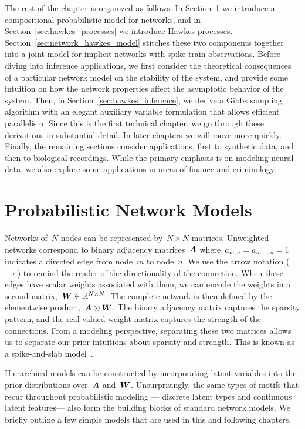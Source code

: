 The rest of the chapter is organized as follows. In
Section~\ref{sec:graph_models} we introduce a compositional
probabilistic model for networks, and in
Section~\ref{sec:hawkes_processes} we introduce Hawkes processes.
Section~\ref{sec:network_hawkes_model} stitches these two components
together into a joint model for implicit networks with spike train
observations.  Before diving into inference applications, we first
consider the theoretical consequences of a particular network model on
the stability of the system, and provide some intuition on how the
network properties affect the asymptotic behavior of the system.
Then, in Section~\ref{sec:hawkes_inference}, we derive a Gibbs
sampling algorithm with an elegant auxiliary variable formulation that
allows efficient parallelism. Since this is the first technical
chapter, we go through these derivations in substantial detail. In
later chapters we will move more quickly.  Finally, the remaining
sections consider applications, first to synthetic data, and then to
biological recordings.  While the primary emphasis is on modeling
neural data, we also explore some applications in areas of finance and
criminology.

\section{Probabilistic Network Models}
\label{sec:graph_models}
Networks of~$N$ nodes can be represented by~${N\times N}$
matrices. Unweighted networks correspond to binary adjacency
matrices~$\boldsymbol{A}$ where~${a_{m,n}=a_{m \to n}=1}$ indicates a directed
edge from node~$m$ to node~$n$. We use the arrow notation ($\to$) to
remind the reader of the directionality of the connection. When these
edges have scalar weights associated with them, we can encode the
weights in a second matrix,~${\boldsymbol{W} \in \mathbb{R}^{N \times N}}$.  The
complete network is then defined by the elementwise product,~${\boldsymbol{A}
  \odot \boldsymbol{W}}$. The binary adjacency matrix captures the sparsity
pattern, and the real-valued weight matrix captures the strength of
the connections. From a modeling perspective, separating these two
matrices allows us to separate our prior intuitions about sparsity and
strength. This is known as a spike-and-slab model~\citep{Mitchell1988}.


Hierarchical models can be constructed by incorporating latent
variables into the prior distributions over~$\boldsymbol{A}$ and~$\boldsymbol{W}$.
Unsurprisingly, the same types of motifs that recur throughout
probabilistic modeling --- discrete latent types and continuous
latent features--- also form the building blocks of
standard network models.  We briefly outline a few simple models that
are used in this and following chapters.

